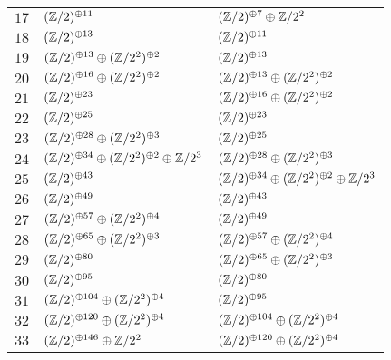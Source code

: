 \begin{supertabular}{|c|p{5.5cm}|p{5.5cm}|}
$17$%
&$(\mathbb{Z}/2)^{\oplus11}$%
&$(\mathbb{Z}/2)^{\oplus7}\oplus\mathbb{Z}/2^{2}$\\

$18$%
&$(\mathbb{Z}/2)^{\oplus13}$%
&$(\mathbb{Z}/2)^{\oplus11}$\\

$19$%
&$(\mathbb{Z}/2)^{\oplus13}\oplus(\mathbb{Z}/2^{2})^{\oplus2}$%
&$(\mathbb{Z}/2)^{\oplus13}$\\

$20$%
&$(\mathbb{Z}/2)^{\oplus16}\oplus(\mathbb{Z}/2^{2})^{\oplus2}$%
&$(\mathbb{Z}/2)^{\oplus13}\oplus(\mathbb{Z}/2^{2})^{\oplus2}$\\

$21$%
&$(\mathbb{Z}/2)^{\oplus23}$%
&$(\mathbb{Z}/2)^{\oplus16}\oplus(\mathbb{Z}/2^{2})^{\oplus2}$\\

$22$%
&$(\mathbb{Z}/2)^{\oplus25}$%
&$(\mathbb{Z}/2)^{\oplus23}$\\

$23$%
&$(\mathbb{Z}/2)^{\oplus28}\oplus(\mathbb{Z}/2^{2})^{\oplus3}$%
&$(\mathbb{Z}/2)^{\oplus25}$\\

$24$%
&$(\mathbb{Z}/2)^{\oplus34}\oplus(\mathbb{Z}/2^{2})^{\oplus2}\oplus\mathbb{Z}/2^{3}$%
&$(\mathbb{Z}/2)^{\oplus28}\oplus(\mathbb{Z}/2^{2})^{\oplus3}$\\

$25$%
&$(\mathbb{Z}/2)^{\oplus43}$%
&$(\mathbb{Z}/2)^{\oplus34}\oplus(\mathbb{Z}/2^{2})^{\oplus2}\oplus\mathbb{Z}/2^{3}$\\

$26$%
&$(\mathbb{Z}/2)^{\oplus49}$%
&$(\mathbb{Z}/2)^{\oplus43}$\\

$27$%
&$(\mathbb{Z}/2)^{\oplus57}\oplus(\mathbb{Z}/2^{2})^{\oplus4}$%
&$(\mathbb{Z}/2)^{\oplus49}$\\

$28$%
&$(\mathbb{Z}/2)^{\oplus65}\oplus(\mathbb{Z}/2^{2})^{\oplus3}$%
&$(\mathbb{Z}/2)^{\oplus57}\oplus(\mathbb{Z}/2^{2})^{\oplus4}$\\

$29$%
&$(\mathbb{Z}/2)^{\oplus80}$%
&$(\mathbb{Z}/2)^{\oplus65}\oplus(\mathbb{Z}/2^{2})^{\oplus3}$\\

$30$%
&$(\mathbb{Z}/2)^{\oplus95}$%
&$(\mathbb{Z}/2)^{\oplus80}$\\

$31$%
&$(\mathbb{Z}/2)^{\oplus104}\oplus(\mathbb{Z}/2^{2})^{\oplus4}$%
&$(\mathbb{Z}/2)^{\oplus95}$\\

$32$%
&$(\mathbb{Z}/2)^{\oplus120}\oplus(\mathbb{Z}/2^{2})^{\oplus4}$%
&$(\mathbb{Z}/2)^{\oplus104}\oplus(\mathbb{Z}/2^{2})^{\oplus4}$\\

$33$%
&$(\mathbb{Z}/2)^{\oplus146}\oplus\mathbb{Z}/2^{2}$%
&$(\mathbb{Z}/2)^{\oplus120}\oplus(\mathbb{Z}/2^{2})^{\oplus4}$\\


\end{supertabular}
